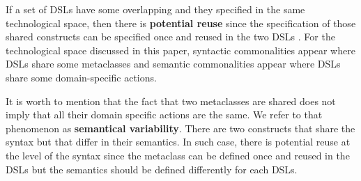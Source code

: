 If a set of DSLs have some overlapping and they specified in the same technological space, then there is \textbf{potential reuse} since the specification of those shared constructs can be specified once and reused in the two DSLs \cite[p. 60-61]{voelter:2013}. For the technological space discussed in this paper, syntactic commonalities appear where DSLs share some metaclasses and semantic commonalities appear where DSLs share some domain-specific actions.


It is worth to mention that the fact that two metaclasses are shared does not imply that all their domain specific actions are the same. We refer to that phenomenon as \textbf{semantical variability}. There are two constructs that share the syntax but that differ in their semantics. In such case, there is potential reuse at the level of the syntax since the metaclass can be defined once and reused in the DSLs but the semantics should be defined differently for each DSLs. 









